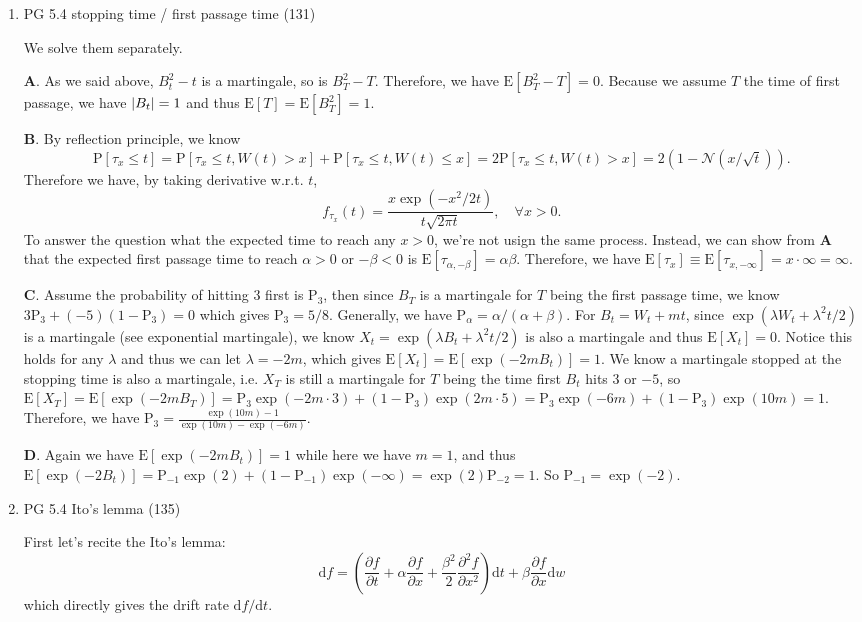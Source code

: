 \documentclass[11pt]{article}
\newcommand{\E}{\text{E}}
\renewcommand{\P}{\text{P}}
\renewcommand{\d}{\text{d}}
\DeclarePairedDelimiter\abs{\lvert}{\rvert}
\newenvironment{note}{\begin{enumerate}[leftmargin=1em,topsep=0pt,noitemsep]}{\end{enumerate}}
\newcommand{\solution}{\boxed{\textbf{SOLUTION}}\hspace{.5em}}
\begin{document}
\begin{spacing}{1.1}
\begin{note}
\item PG 5.4 stopping time / first passage time (131)

\solution We solve them separately. 

\textbf{A}. As we said above, $B_t^2-t$ is a martingale, so is $B_T^2-T$. Therefore, we have $\E[B_T^2-T]=0$. Because we assume $T$ the time of first passage, we have $\abs{B_t}=1$ and thus $\E[T] = \E[B_T^2] = 1$.

\textbf{B}. By reflection principle, we know 
$$
\P[\tau_x \le t] = \P[\tau_x \le t, W(t) > x] + \P[\tau_x \le t, W(t) \le x] = 2 \P[\tau_x \le t, W(t) > x] = 2(1 - \mathcal{N}(x / \sqrt{t})).
$$
Therefore we have, by taking derivative w.r.t. $t$,
$$
f_{\tau_x}(t) = \frac{x\exp(-x^2/2t)}{t\sqrt{2\pi t}},\quad \forall x > 0.
$$
To answer the question what the expected time to reach any $x>0$, we're not usign the same process. Instead, we can show from \textbf{A} that the expected first passage time to reach $\alpha>0$ or $-\beta<0$ is $\E[\tau_{\alpha,-\beta}]=\alpha\beta$. Therefore, we have $\E[\tau_x]\equiv\E[\tau_{x,-\infty}]=x\cdot\infty=\infty$.

\textbf{C}. Assume the probability of hitting $3$ first is $\P_3$, then since $B_T$ is a martingale for $T$ being the first passage time, we know $3\P_3 + (-5)(1- \P_3)=0$ which gives $\P_3 = 5/8$. Generally, we have $\P_{\alpha}=\alpha/(\alpha + \beta)$. For $B_t=W_t+mt$, since $\exp(\lambda W_t + \lambda^2t/2)$ is a martingale (see exponential martingale), we know $X_t = \exp(\lambda B_t + \lambda^2t/2)$ is also a martingale and thus $\E[X_t]=0$. Notice this holds for any $\lambda$ and thus we can let $\lambda = -2m$, which gives $\E[X_t] = \E[\exp(-2mB_t)]=1$. We know a martingale stopped at the stopping time is also a martingale, i.e. $X_T$ is still a martingale for $T$ being the time first $B_t$ hits $3$ or $-5$, so $\E[X_T] = \E[\exp(-2mB_T)]=\P_3\exp(-2m\cdot 3) + (1-\P_3)\exp(2m\cdot 5) = \P_3\exp(-6m)+(1-\P_3)\exp(10m)=1$. Therefore, we have $\P_3 = \frac{\exp(10m)-1}{\exp(10m)-\exp(-6m)}$.

\textbf{D}. Again we have $\E[\exp(-2mB_t)]=1$ while here we have $m=1$, and thus $\E[\exp(-2B_t)]=\P_{-1}\exp(2) + (1-\P_{-1})\exp(-\infty)=\exp(2)\P_{-2}=1$. So $\P_{-1}=\exp(-2)$.

\item PG 5.4 Ito's lemma (135) 

\solution First let's recite the Ito's lemma:
$$
\d f = \left(\frac{\partial f}{\partial t} + \alpha \frac{\partial f}{\partial x} + \frac{\beta^2}{2}\frac{\partial^2 f}{\partial x^2}\right)\d t + \beta \frac{\partial f}{\partial x}\d w
$$
which directly gives the drift rate $\d f / \d t$.


\end{note}
\end{spacing}
\end{document}
